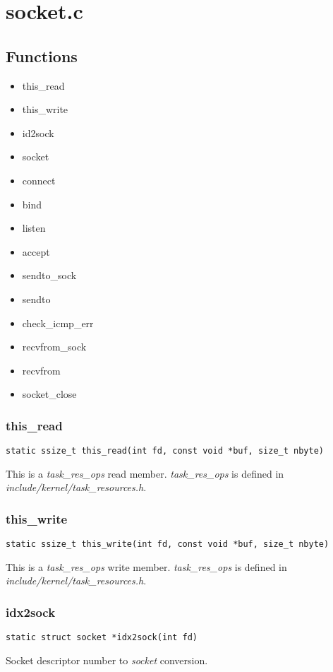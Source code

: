 \documentclass[12pt,a4paper]{article}
\begin{document}
\section{socket.c}
\label{sec:socket_c_socket.c}
\subsection{Functions}
\label{sec:socket_c_socket_functions}
{\it
\begin{itemize}
  \item this\_read
  \item this\_write
  \item id2sock
  \item socket
  \item connect
  \item bind
  \item listen
  \item accept
  \item sendto\_sock
  \item sendto
  \item check\_icmp\_err
  \item recvfrom\_sock
  \item recvfrom
  \item socket\_close
\end{itemize}
}

\subsubsection{this\_read}
\label{sec:socket_c_this_read}
\begin{verbatim}
static ssize_t this_read(int fd, const void *buf, size_t nbyte)
\end{verbatim}
This is a {\it task\_res\_ops} read member. {\it task\_res\_ops} is defined
in {\it include/kernel/task\_resources.h}.


\subsubsection{this\_write}
\label{sec:socket_c_this_write}
\begin{verbatim}
static ssize_t this_write(int fd, const void *buf, size_t nbyte)
\end{verbatim}
This is a {\it task\_res\_ops} write member.  {\it task\_res\_ops} is defined
in {\it include/kernel/task\_resources.h}.

\subsubsection{idx2sock}
\label{sec:socket_c_idx2sock}
\begin{verbatim}
static struct socket *idx2sock(int fd)
\end{verbatim}
Socket descriptor number to {\it socket} conversion.
\end{document}
